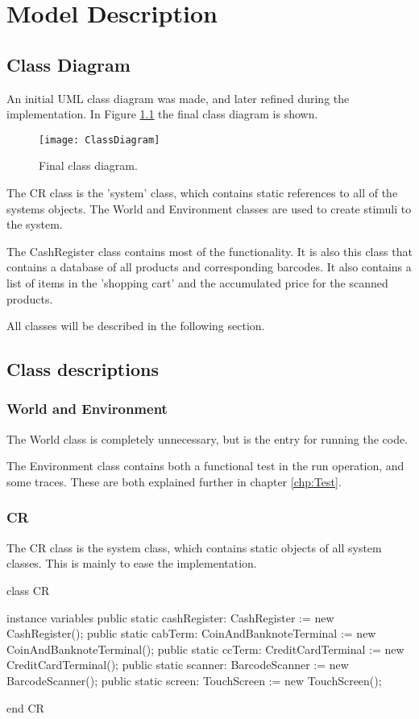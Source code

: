 \chapter{Model Description}

\section{Class Diagram}
An initial UML class diagram was made, and later refined during the implementation. 
In Figure \ref{fig:SimpleClassDiagram} the final class diagram is shown.

\begin{figure}[H]
\centering
\texttt{[image: ClassDiagram]}
\caption{Final class diagram.}
\label{fig:SimpleClassDiagram}
\end{figure}

The CR class is the 'system' class, which contains static references to all of the systems objects. 
The World and Environment classes are used to create stimuli to the system.

The CashRegister class contains most of the functionality. It is also this class that contains a database of all products and corresponding barcodes. 
It also contains a list of items in the 'shopping cart' and the accumulated price for the scanned products.

All classes will be described in the following section.

\newpage
\section{Class descriptions}

\subsection{World and Environment}
The World class is completely unnecessary, but is the entry for running the code.

The Environment class contains both a functional test in the run operation, and some traces. These are both explained further in chapter \ref{chp:Test}.

\subsection{CR}
The CR class is the system class, which contains static objects of all system classes. This is mainly to ease the implementation.
\begin{vdmpp}
class CR
 
instance variables
 public static cashRegister: CashRegister := new CashRegister(); 
 public static cabTerm: CoinAndBanknoteTerminal := new CoinAndBanknoteTerminal();
 public static ccTerm: CreditCardTerminal := new CreditCardTerminal();
 public static scanner: BarcodeScanner := new BarcodeScanner();
 public static screen: TouchScreen := new TouchScreen(); 
  
end CR
\end{vdmpp}

